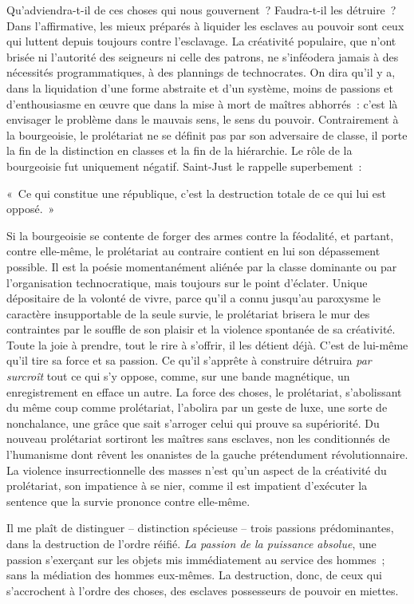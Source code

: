 \documentclass[french,twoside]{book} %
\newenvironment{quoteblock}%
  {\begin{quoting}}
  {\end{quoting}}
\newenvironment{quotebar}{%
    \def\FrameCommand{{\color{rubric!10!}\vrule width 0.5em} \hspace{0.9em}}%
    \def\OuterFrameSep{\itemsep} %
    \MakeFramed {\advance\hsize-\width \FrameRestore}
  }%
  {%
    \endMakeFramed
  }
\renewenvironment{quoteblock}%
  {%
    \savenotes
    \setstretch{0.9}
    \normalfont
    \begin{quotebar}
  }
  {%
    \end{quotebar}
    \spewnotes
  }
\begin{document}
Qu’adviendra-t-il de ces choses qui nous gouvernent ? Faudra-t-il les détruire ? Dans l’affirmative, les mieux préparés à liquider les esclaves au pouvoir sont ceux qui luttent depuis toujours contre l’esclavage. La créativité populaire, que n’ont brisée ni l’autorité des seigneurs ni celle des patrons, ne s’inféodera jamais à des nécessités programmatiques, à des plannings de technocrates. On dira qu’il y a, dans la liquidation d’une forme abstraite et d’un système, moins de passions et d’enthousiasme en œuvre que dans la mise à mort de maîtres abhorrés : c’est là envisager le problème dans le mauvais sens, le sens du pouvoir. Contrairement à la bourgeoisie, le prolétariat ne se définit pas par son adversaire de classe, il porte la fin de la distinction en classes et la fin de la hiérarchie. Le rôle de la bourgeoisie fut uniquement négatif. Saint-Just le rappelle superbement :\par

\begin{quoteblock}
\noindent « Ce qui constitue une république, c’est la destruction totale de ce qui lui est opposé. »\end{quoteblock}

\noindent Si la bourgeoisie se contente de forger des armes contre la féodalité, et partant, contre elle-même, le prolétariat au contraire contient en lui son dépassement possible. Il est la poésie momentanément aliénée par la classe dominante ou par l’organisation technocratique, mais toujours sur le point d’éclater. Unique dépositaire de la volonté de vivre, parce qu’il a connu jusqu’au paroxysme le caractère insupportable de la seule survie, le prolétariat brisera le mur des contraintes par le souffle de son plaisir et la violence spontanée de sa créativité. Toute la joie à prendre, tout le rire à s’offrir, il les détient déjà. C’est de lui-même qu’il tire sa force et sa passion. Ce qu’il s’apprête à construire détruira \emph{par surcroît} tout ce qui s’y oppose, comme, sur une bande magnétique, un enregistrement en efface un autre. La force des choses, le prolétariat, s’abolissant du même coup comme prolétariat, l’abolira par un geste de luxe, une sorte de nonchalance, une grâce que sait s’arroger celui qui prouve sa supériorité. Du nouveau prolétariat sortiront les maîtres sans esclaves, non les conditionnés de l’humanisme dont rêvent les onanistes de la gauche prétendument révolutionnaire. La violence insurrectionnelle des masses n’est qu’un aspect de la créativité du prolétariat, son impatience à se nier, comme il est impatient d’exécuter la sentence que la survie prononce contre elle-même.\par
Il me plaît de distinguer – distinction spécieuse – trois passions prédominantes, dans la destruction de l’ordre réifié. \emph{La passion de la puissance absolue}, une passion s’exerçant sur les objets mis immédiatement au service des hommes ; sans la médiation des hommes eux-mêmes. La destruction, donc, de ceux qui s’accrochent à l’ordre des choses, des esclaves possesseurs de pouvoir en miettes.\par
\end{document}
